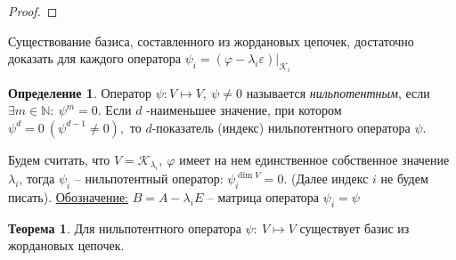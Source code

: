 \documentclass[a4paper, 12pt]{article}
\theoremstyle{definition}
\newtheorem*{definition}{Определение}
\newtheorem*{theorem}{Теорема}
\begin{document}
\begin{proof}
    \end{proof}
    Существование базиса, составленного из жордановых цепочек,
    достаточно доказать для каждого оператора $\psi_i = 
    (\varphi - \lambda_i \varepsilon)|_{\mathcal{K}_i}$ 
    \begin{definition}
        Оператор $\psi: V \longmapsto V,\ \psi \neq 0$ 
        называется \textit{нильпотентным}, если $\exists
        m \in \mathbb{N}:\ \psi^m = 0$. Если $d$ -наименьшее
        значение, при котором\\ $\psi^d = 0\ (\psi^{d-1} \neq 0),$
        то $d$-показатель (индекс) нильпотентного оператора $\psi$.  
    \end{definition}
    Будем считать, что $V = \mathcal{K}_{\lambda_i},\ \varphi$
    имеет на нем единственное собственное значение $\lambda_i$,
    тогда $\psi_i$ -- нильпотентный оператор: $\psi_i^{\dim V} = 0.$
    (Далее индекс $i$ не будем писать). 
    \underline{Обозначение:} $B = A - \lambda_i E$ --
    матрица оператора $\psi_i = \psi$
    \newpage
    \begin{theorem}
        Для нильпотентного оператора $\psi:\ V \longmapsto V$
        существует базис из жордановых цепочек.
    \end{theorem}  
\end{document}
